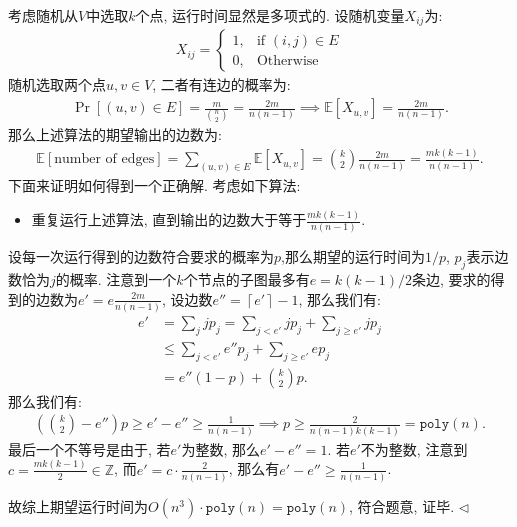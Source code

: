 \documentclass[11pt]{article}
\newenvironment{answer}[1][Solution]{\begin{trivlist}
\item[\hskip \labelsep{\bfseries#1.}\hskip \labelsep]}{\hfill$\lhd$\end{trivlist}}
\newcommand\E{\mathbb{E}}
\begin{document}
\begin{answer}
    考虑随机从$V$中选取$k$个点, 运行时间显然是多项式的. 设随机变量$X_{ij}$为:
    \begin{align*}
        X_{ij} = \begin{cases}
            1, & \text{if } (i,j) \in E \\
            0, & \text{Otherwise}
        \end{cases}
    \end{align*}
    随机选取两个点$u,v\in V$, 二者有连边的概率为:
    \begin{align*}
        \Pr[(u,v)\in E] = \frac{m}{\binom{n}{2}} = \frac{2m}{n(n-1)} \implies \E[X_{u,v}] = \frac{2m}{n(n-1)}. 
    \end{align*}
    那么上述算法的期望输出的边数为:
    \begin{align*}
        \E[\text{number of edges}] = \sum_{(u,v)\in E} \E[X_{u,v}] = \binom{k}{2} \frac{2m}{n(n-1)} = \frac{mk(k-1)}{n(n-1)}.
    \end{align*}
    下面来证明如何得到一个正确解. 考虑如下算法:
    \begin{itemize}
        \item 重复运行上述算法, 直到输出的边数大于等于$\frac{mk(k-1)}{n(n-1)}$.
    \end{itemize}
    设每一次运行得到的边数符合要求的概率为$p$,那么期望的运行时间为$1/p$, $p_j$表示边数恰为$j$的概率. 注意到一个$k$个节点的子图最多有$e = k(k-1)/2$条边, 要求的得到的边数为$e' = e \frac{2m}{n(n-1)}$, 设边数$e'' = \left\lceil e'\right\rceil - 1$, 那么我们有:
    \begin{align*}
        e' &= \sum_j jp_j = \sum_{j<e'} jp_j + \sum_{j\ge e'} jp_j \\
        &\le \sum_{j<e'} e''p_j + \sum_{j\ge e'} ep_j \\
        &= e''(1-p) + \binom{k}{2} p.
    \end{align*}
    那么我们有:
    \begin{align*}
        \left(\binom{k}{2} - e''\right)p \ge e' - e'' \ge \frac{1}{n(n-1)} \implies p \ge \frac{2}{n(n-1)k(k-1)} = \texttt{poly}(n).
    \end{align*}
    最后一个不等号是由于, 若$e'$为整数, 那么$e' - e'' = 1$. 若$e'$不为整数, 注意到$c = \frac{mk(k-1)}{2} \in \mathbb{Z}$, 而$e' = c\cdot\frac{2}{n(n-1)}$, 那么有$e' - e'' \ge \frac{1}{n(n-1)}$. 

    故综上期望运行时间为$O(n^3)\cdot\texttt{poly}(n) = \texttt{poly}(n)$, 符合题意, 证毕.
\end{answer}
\end{document}

